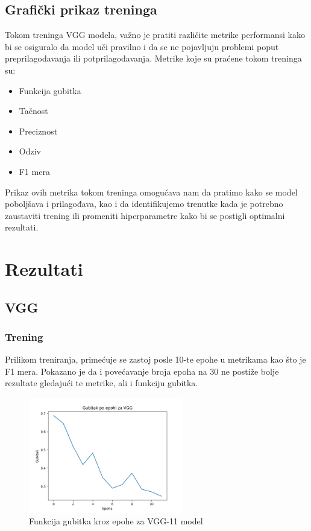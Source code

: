 \documentclass{article}
\begin{document}
\subsection{Grafički prikaz treninga}

Tokom treninga VGG modela, važno je pratiti različite metrike performansi kako bi se osiguralo da model uči pravilno i da se ne pojavljuju problemi poput preprilagođavanja ili potprilagođavanja. Metrike koje su praćene tokom treninga su:
\begin{itemize}
    \item Funkcija gubitka
    \item Tačnost
    \item Preciznost
    \item Odziv
    \item F1 mera
\end{itemize}

Prikaz ovih metrika tokom treninga omogućava nam da pratimo kako se model poboljšava i prilagođava, kao i da identifikujemo trenutke kada je potrebno zaustaviti trening ili promeniti hiperparametre kako bi se postigli optimalni rezultati.


\section{Rezultati}

\subsection{VGG}

\subsubsection{Trening}

Prilikom treniranja, primećuje se zastoj posle 10-te epohe u metrikama kao što je F1 mera. Pokazano je da i povećavanje broja epoha na 30 ne postiže bolje rezultate gledajući te metrike, ali i funkciju gubitka.

\begin{figure}[H]
    \centering
    \includegraphics[width=0.6\textwidth]{rezultati/VGG_gubitak_po_epohi.png} 
    \caption{Funkcija gubitka kroz epohe za VGG-11 model} 
    \label{VGG gubitak po epohi}
\end{figure}
\end{document}
